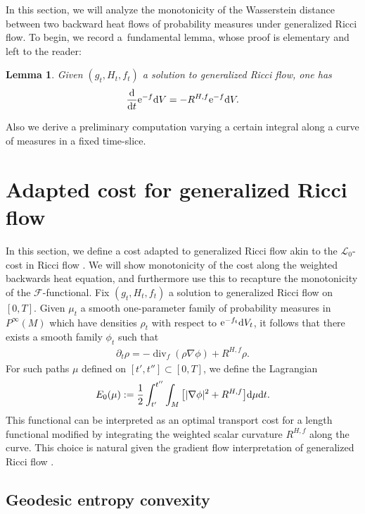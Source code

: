 \documentclass[11pt]{article}
\numberwithin{equation}{section}
\numberwithin{equation}{section}
\newtheorem{Lemma}[thm]{Lemma}
\newcommand{\del}{\partial}
\newcommand{\N}{\nabla}
\newcommand{\FF}{\mathcal F}
\newcommand{\LL}{\mathcal L}
\DeclareMathOperator{\divg}{div}
\begin{document}
In this section, we will analyze the monotonicity of the Wasserstein distance between two backward heat flows of probability measures under generalized Ricci flow. To begin, we record a~fundamental lemma, whose proof is elementary and left to the reader:

\begin{Lemma} \label{l:volumeev} Given $(g_t, H_t, f_t)$ a solution to generalized Ricci flow, one has
\begin{align*}
 \frac{{\rm d}}{{\rm d}t} {\rm e}^{-f} {\rm d}V = - R^{H,f} {\rm e}^{-f} {\rm d}V.
\end{align*}
\end{Lemma}

Also we derive a preliminary computation varying a certain integral along a curve of measures in a fixed time-slice.



\section{Adapted cost for generalized Ricci flow}

In this section, we define a cost adapted to generalized Ricci flow akin to the $\LL_0$-cost in Ricci flow \cite{LottOTPRV}. We will show monotonicity of the cost along the weighted backwards heat equation, and furthermore use this to recapture the monotonicity of the $\FF$-functional. Fix $(g_t, H_t, f_t)$ a solution to generalized Ricci flow on $[0,T]$. Given $\mu_t$ a smooth one-parameter family of probability measures in $P^\infty(M)$ which have densities $\rho_t$ with respect to ${\rm e}^{-f_t} {\rm d}V_t$, it follows that there exists a smooth family $\phi_t$ such that
\begin{align} \label{eq: conteq}
 \del_t\rho=-\divg_f(\rho\N\phi)+R^{H,f}\rho.
\end{align}
For such paths $\mu$ defined on $[t',t''] \subset [0,T]$, we define the Lagrangian
\begin{align*}
E_0(\mu):=\frac12\int_{t'}^{t''}\int_M \big[ |\N\phi|^2+R^{H,f} \big] {\rm d}\mu {\rm d}t.
\end{align*}
This functional can be interpreted as an optimal transport cost for a length functional modified by integrating the weighted scalar curvature $R^{H,f}$ along the curve. This choice is natural given the gradient flow interpretation of generalized Ricci flow \cite{OSW}.

\subsection{Geodesic entropy convexity}
\end{document}
